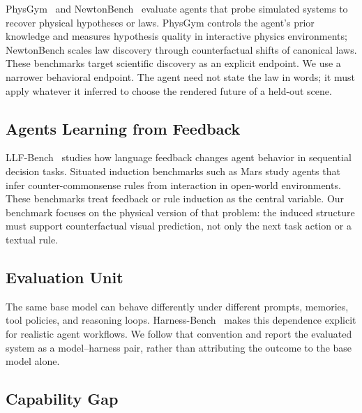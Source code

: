 PhysGym~\cite{physgym} and NewtonBench~\cite{newtonbench} evaluate agents that probe simulated systems to recover physical hypotheses or laws. PhysGym controls the agent's prior knowledge and measures hypothesis quality in interactive physics environments; NewtonBench scales law discovery through counterfactual shifts of canonical laws. These benchmarks target scientific discovery as an explicit endpoint. We use a narrower behavioral endpoint. The agent need not state the law in words; it must apply whatever it inferred to choose the rendered future of a held-out scene.

\subsection{Agents Learning from Feedback}

LLF-Bench~\cite{llfbench} studies how language feedback changes agent behavior in sequential decision tasks. Situated induction benchmarks such as Mars study agents that infer counter-commonsense rules from interaction in open-world environments.  These benchmarks treat feedback or rule induction as the central variable. Our benchmark focuses on the physical version of that problem: the induced structure must support counterfactual visual prediction, not only the next task action or a textual rule.

\subsection{Evaluation Unit}

The same base model can behave differently under different prompts, memories, tool policies, and reasoning loops. Harness-Bench~\cite{harnessbench} makes this dependence explicit for realistic agent workflows. We follow that convention and report the evaluated system as a model--harness pair, rather than attributing the outcome to the base model alone.

\subsection{Capability Gap}

